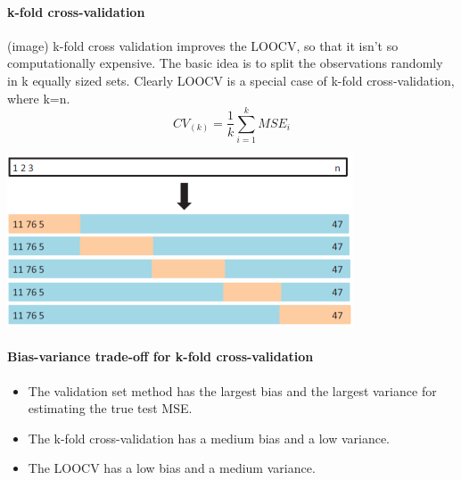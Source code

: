\documentclass[../document.tex]{subfiles}
\begin{document}
	\paragraph{k-fold cross-validation}
	(image)
	k-fold cross validation improves the LOOCV, so that it isn't so computationally expensive. The basic idea is to split the observations randomly in k equally sized sets. Clearly LOOCV is a special case of k-fold cross-validation, where k=n.
	\begin{equation}
		CV_{(k)}=\frac{1}{k}\sum_{i=1}^{k}MSE_{i}
	\end{equation}
	\begin{center}
		\includegraphics[width=.6\textwidth]{pictures/cross_validation_k_fold.png}
	\end{center}

	\paragraph{Bias-variance trade-off for k-fold cross-validation}
	\begin{itemize}
		\item The validation set method has the largest bias and the largest variance for estimating the true test MSE.
		\item The k-fold cross-validation has a medium bias and a low variance.
		\item The LOOCV has a low bias and a medium variance.

	\end{itemize}
\end{document}
